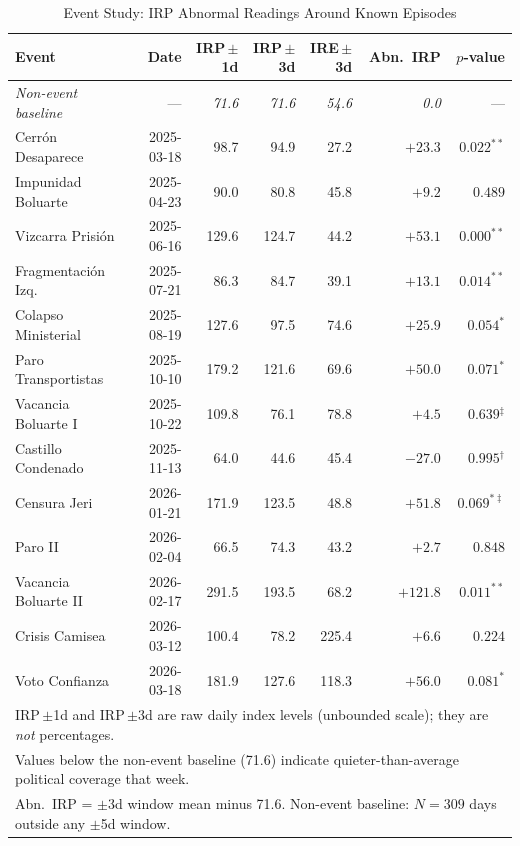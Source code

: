 \documentclass[12pt,a4paper]{article}
\begin{document}
\begin{table}[h!]
\centering
\caption{Event Study: IRP Abnormal Readings Around Known Episodes}
\label{tab:event_study}
\small
\begin{tabular}{lrrrrrr}
\toprule
Event & Date & IRP\,$\pm$1d & IRP\,$\pm$3d & IRE\,$\pm$3d & Abn.\ IRP & $p$-value \\
\midrule
\emph{Non-event baseline} & --- & \emph{71.6} & \emph{71.6} & \emph{54.6} & \emph{0.0} & --- \\
\midrule
Cerr\'on Desaparece    & 2025-03-18 &  98.7 &  94.9 &  27.2 & $+23.3$ & $0.022^{**}$ \\
Impunidad Boluarte     & 2025-04-23 &  90.0 &  80.8 &  45.8 &  $+9.2$ & $0.489$ \\
Vizcarra Prisi\'on     & 2025-06-16 & 129.6 & 124.7 &  44.2 & $+53.1$ & $0.000^{**}$ \\
Fragmentaci\'on Izq.   & 2025-07-21 &  86.3 &  84.7 &  39.1 & $+13.1$ & $0.014^{**}$ \\
Colapso Ministerial    & 2025-08-19 & 127.6 &  97.5 &  74.6 & $+25.9$ & $0.054^{*}$ \\
Paro Transportistas    & 2025-10-10 & 179.2 & 121.6 &  69.6 & $+50.0$ & $0.071^{*}$ \\
Vacancia Boluarte I    & 2025-10-22 & 109.8 &  76.1 &  78.8 &  $+4.5$ & $0.639$$^\ddagger$ \\
Castillo Condenado     & 2025-11-13 &  64.0 &  44.6 &  45.4 & $-27.0$ & $0.995$$^\dagger$ \\
Censura Jeri           & 2026-01-21 & 171.9 & 123.5 &  48.8 & $+51.8$ & $0.069^{*\ddagger}$ \\
Paro II                & 2026-02-04 &  66.5 &  74.3 &  43.2 &  $+2.7$ & $0.848$ \\
Vacancia Boluarte II   & 2026-02-17 & 291.5 & 193.5 &  68.2 & $+121.8$ & $0.011^{**}$ \\
Crisis Camisea         & 2026-03-12 & 100.4 &  78.2 & 225.4 &  $+6.6$ & $0.224$ \\
Voto Confianza         & 2026-03-18 & 181.9 & 127.6 & 118.3 & $+56.0$ & $0.081^{*}$ \\
\bottomrule
\multicolumn{7}{l}{\footnotesize IRP\,$\pm$1d and IRP\,$\pm$3d are raw daily index levels (unbounded scale); they are \emph{not} percentages.} \\
\multicolumn{7}{l}{\footnotesize Values below the non-event baseline (71.6) indicate quieter-than-average political coverage that week.} \\
\multicolumn{7}{l}{\footnotesize Abn.\ IRP = $\pm$3d window mean minus 71.6. Non-event baseline: $N = 309$ days outside any $\pm$5d window.} \\

\end{tabular}
\end{table}
\end{document}
